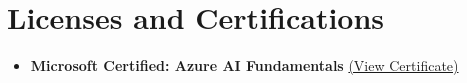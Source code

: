 \documentclass[letterpaper,11pt]{article}
\newcommand{\resumeSubHeadingListStart}{\begin{itemize}[leftmargin=*]}
\newcommand{\resumeSubHeadingListEnd}{\end{itemize}}
\begin{document}
\section{Licenses and Certifications}
 \resumeSubHeadingListStart
   \item{
     \textbf{Microsoft Certified: Azure AI Fundamentals} \href{https://www.credly.com/badges/1755ae09-3878-4274-bb2d-88e292cd0b5b?source=linked_in_profile}{(View Certificate)}
   }
 \resumeSubHeadingListEnd

\end{document}
